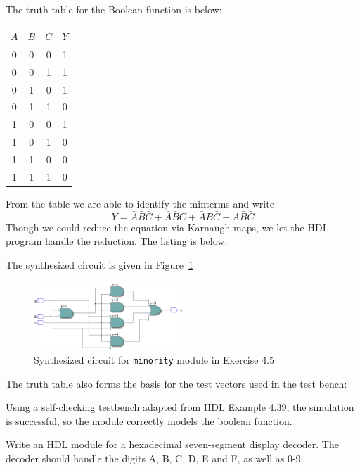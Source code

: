 \documentclass[12pt]{article}
\newenvironment{ex}[2][Exercise]{\begin{trivlist}
		\item[\hskip \labelsep {\bfseries #1}\hskip \labelsep {\bfseries #2.}]}{\end{trivlist}}
\newenvironment{sol}[1][Solution]{\begin{trivlist}
		\item[\hskip \labelsep {\bfseries #1:}]}{\end{trivlist}}
\begin{document}
\begin{sol}
	The truth table for the Boolean function is below:
	\begin{center}
		\begin{tabular}{ccc|c}
			$A$ & $B$ & $C$ & $Y$\\
			\hline
			0 & 0 & 0 & 1\\
			0 & 0 & 1 & 1\\
			0 & 1 & 0 & 1\\
			0 & 1 & 1 & 0\\
			1 & 0 & 0 & 1\\
			1 & 0 & 1 & 0\\
			1 & 1 & 0 & 0\\
			1 & 1 & 1 & 0\\
		\end{tabular}
	\end{center}
	From the table we are able to identify the minterms and write
	\[
	Y=\bar{A}\bar{B}\bar{C}+\bar{A}\bar{B}C+\bar{A}B\bar{C}+A\bar{B}\bar{C}
	\]
	Though we could reduce the equation via Karnaugh maps, we let the HDL program handle the reduction.
	The listing is below:
	
	The synthesized circuit is given in Figure~\ref{04-05-minority-circuit-synth}
	\begin{figure}
		\centering
		\includegraphics[width=0.5\textwidth]{04-05-minority-synth-circuit}
		\caption{Synthesized circuit for \texttt{minority} module in Exercise 4.5}
		\label{04-05-minority-circuit-synth}
	\end{figure}
	The truth table also forms the basis for the test vectors used in the test bench:
	
	Using a self-checking testbench adapted from HDL Example 4.39, the simulation is successful,
	so the module correctly models the boolean function.
\end{sol}

\begin{ex}{4.6}
	Write an HDL module for a hexadecimal seven-segment display decoder. The decoder should
	handle the digits A, B, C, D, E and F, as well as 0-9.
\end{ex}
\end{document}

